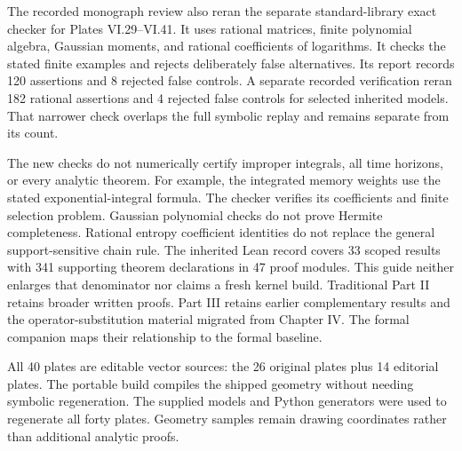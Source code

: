 The recorded monograph review also reran the separate standard-library exact checker for Plates VI.29--VI.41. It uses rational matrices, finite polynomial algebra, Gaussian moments, and rational coefficients of logarithms. It checks the stated finite examples and rejects deliberately false alternatives. Its report records 120 assertions and 8 rejected false controls. A separate recorded verification reran 182 rational assertions and 4 rejected false controls for selected inherited models. That narrower check overlaps the full symbolic replay and remains separate from its count.

The new checks do not numerically certify improper integrals, all time horizons, or every analytic theorem. For example, the integrated memory weights use the stated exponential-integral formula. The checker verifies its coefficients and finite selection problem. Gaussian polynomial checks do not prove Hermite completeness. Rational entropy coefficient identities do not replace the general support-sensitive chain rule.
The inherited Lean record covers 33 scoped results with 341 supporting theorem declarations in 47 proof modules. This guide neither enlarges that denominator nor claims a fresh kernel build. Traditional Part II retains broader written proofs. Part III retains earlier complementary results and the operator-substitution material migrated from Chapter IV. The formal companion maps their relationship to the formal baseline.

All 40 plates are editable vector sources: the 26 original plates plus 14 editorial plates. The portable build compiles the shipped geometry without needing symbolic regeneration. The supplied models and Python generators were used to regenerate all forty plates. Geometry samples remain drawing coordinates rather than additional analytic proofs.
